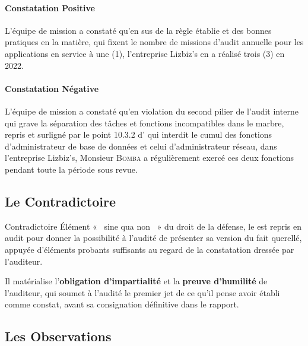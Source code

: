 \paragraph{Constatation Positive}
L'équipe de mission a constaté qu'en sus de la règle établie et des bonnes pratiques
en la matière, qui fixent le nombre de missions d'audit annuelle pour les applications
en service à une (1), l'entreprise Lizbiz's en a réalisé trois (3) en 2022.

\paragraph{Constatation Négative}
L'équipe de mission a constaté qu'en violation du second pilier de l'audit interne qui
grave la séparation des tâches et fonctions incompatibles dans le marbre, repris et
surligné par le point 10.3.2 d' qui interdit le cumul des fonctions
d'administrateur de base de données et celui d'administrateur réseau, dans l'entreprise
Lizbiz's, Monsieur \textsc{Bomba} a régulièrement exercé ces deux fonctions pendant
toute la période sous revue.

\subsection{Le Contradictoire}

\begin{boxdef}{Contradictoire}
Élément «~ sine qua non ~»{} du droit de la défense, le 
est repris en audit pour donner la possibilité à l'audité de présenter sa version du
fait querellé, appuyée d'éléments probants suffisants au regard de la constatation
dressée par l'auditeur.

Il matérialise l'\textbf{obligation d'impartialité} et la \textbf{preuve d'humilité}
de l'auditeur, qui soumet à l'audité le premier jet de ce qu'il pense avoir établi comme
constat, avant sa consignation définitive dans le rapport.
\end{boxdef}

\subsection{Les Observations}

